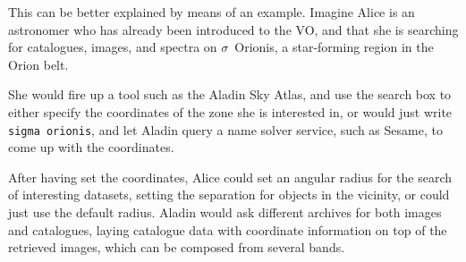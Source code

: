 		 This can be better explained by means of an example.
		Imagine Alice is an astronomer who has already been
		introduced to the VO, and that she is searching for
		catalogues, images, and spectra on $\sigma$~Orionis, a
		star-forming region in the Orion belt.
		
		 She would fire up a tool such as the Aladin Sky Atlas, and
		use the search box to either specify the coordinates of the
		zone she is interested in, or would just write
		\texttt{sigma orionis}, and let Aladin query a name solver
		service, such as Sesame, to come up with the coordinates.
		
		 After having set the coordinates, Alice could set an
		angular radius for the search of interesting datasets,
		setting the separation for objects in the vicinity, or
		could just use the default radius. Aladin would ask
		different archives for both images and catalogues, laying
		catalogue data with coordinate information on top of the
		retrieved images, which can be composed from several bands.
		
